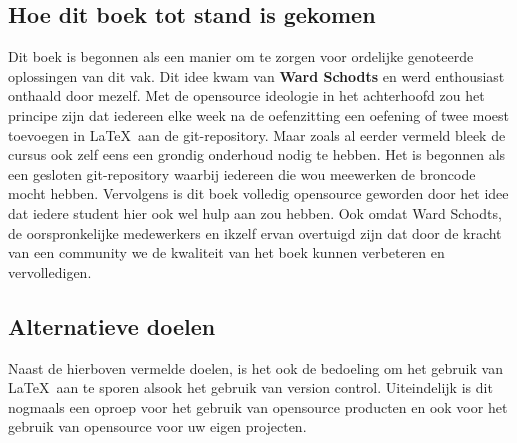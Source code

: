 \documentclass[lineaire_algebra_oplossingen.tex]{subfiles}
\begin{document}
\subsection*{Hoe dit boek tot stand is gekomen}
Dit boek is begonnen als een manier om te zorgen voor ordelijke genoteerde oplossingen van dit vak.
Dit idee kwam van \textbf{Ward Schodts} en werd enthousiast onthaald door mezelf.
Met de opensource ideologie in het achterhoofd zou het principe zijn dat iedereen elke week na de oefenzitting een oefening of twee moest toevoegen in \LaTeX \ aan de git-repository.
Maar zoals al eerder vermeld bleek de cursus ook zelf eens een grondig onderhoud nodig te hebben.
Het is begonnen als een gesloten git-repository waarbij iedereen die wou meewerken de broncode mocht hebben.
Vervolgens is dit boek volledig opensource geworden door het idee dat iedere student hier ook wel hulp aan zou hebben.
Ook omdat Ward Schodts, de oorspronkelijke medewerkers en ikzelf ervan overtuigd zijn dat door de kracht van een community we de kwaliteit van het boek kunnen verbeteren en vervolledigen.

\subsection*{Alternatieve doelen}
Naast de hierboven vermelde doelen, is het ook de bedoeling om het gebruik van \LaTeX \ aan te sporen alsook het gebruik van version control.
Uiteindelijk is dit nogmaals een oproep voor het gebruik van opensource producten en ook voor het gebruik van opensource voor uw eigen projecten.
\end{document}
